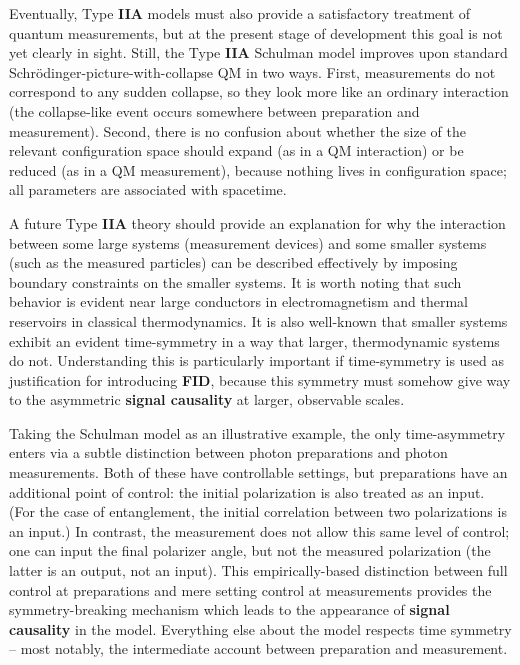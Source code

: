 \documentclass[onecolumn, nofootinbib, 12pt]{revtex4-1}
\begin{document}
Eventually, Type {\bf IIA} models must also provide a satisfactory treatment of quantum measurements, but at the present stage of development this goal is not yet clearly in sight.  Still, the Type {\bf IIA} Schulman model improves upon standard Schr\"odinger-picture-with-collapse QM in two ways.  First, measurements do not correspond to any sudden collapse, so they look more like an ordinary interaction (the collapse-like event occurs somewhere between preparation and measurement).  Second, there is no confusion about whether the size of the relevant configuration space should expand (as in a QM interaction) or be reduced (as in a QM measurement), because nothing lives in configuration space; all parameters are associated with spacetime.

A future Type {\bf IIA} theory should provide an explanation for why the interaction between some large systems (measurement devices) and some smaller systems (such as the measured particles) can be described effectively by imposing boundary constraints on the smaller systems.  It is worth noting that such behavior is evident near large conductors in electromagnetism and thermal reservoirs in classical thermodynamics.  It is also well-known that smaller systems exhibit an evident time-symmetry in a way that larger, thermodynamic systems do not.  Understanding this is particularly important if time-symmetry is used as justification for introducing {\bf FID}, because this symmetry must somehow give way to the asymmetric {\bf signal causality} at larger, observable scales.

Taking the Schulman model as an illustrative example, the only time-asymmetry enters via a subtle distinction between photon preparations and photon measurements.  Both of these have controllable settings, but preparations have an additional point of control: the initial polarization is also treated as an input.  (For the case of entanglement, the initial correlation between two polarizations is an input.)  In contrast, the measurement does not allow this same level of control; one can input the final polarizer angle, but not the measured polarization (the latter is an output, not an input).  This empirically-based distinction between full control at preparations and mere setting control at measurements provides the symmetry-breaking mechanism which leads to the appearance of {\bf signal causality} in the model.  Everything else about the model respects time symmetry -- most notably, the intermediate account between preparation and measurement.
\end{document}

